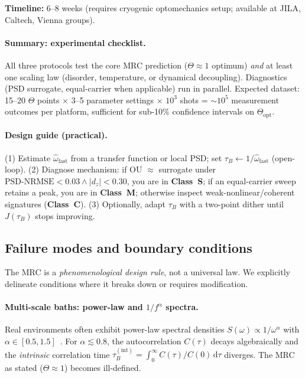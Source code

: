 \documentclass[11pt,letterpaper]{article}
\DeclareRobustCommand{\classS}{\textbf{Class~S}\xspace}
\DeclareRobustCommand{\classC}{\textbf{Class~C}\xspace}
\DeclareRobustCommand{\classM}{\textbf{Class~M}\xspace}
\DeclareRobustCommand{\GatePSD}{\ensuremath{\text{PSD-NRMSE}<0.03}\xspace}
\DeclareRobustCommand{\GateDZ}{\ensuremath{\lvert d_z\rvert<0.30}\xspace}
\DeclareRobustCommand{\GateEQ}{\ensuremath{\GatePSD \wedge \GateDZ}\xspace}
\begin{document}
\textbf{Timeline:} 6--8 weeks (requires cryogenic optomechanics setup;
available at JILA, Caltech, Vienna groups).

\paragraph{Summary: experimental checklist.}
All three protocols test the core MRC prediction ($\Theta\approx 1$ optimum)
\emph{and} at least one scaling law (disorder, temperature, or dynamical
decoupling). Diagnostics (PSD surrogate, equal-carrier when applicable) run
in parallel. Expected dataset: 15--20 $\Theta$ points $\times$ 3--5 parameter
settings $\times$ $10^3$ shots = $\sim 10^5$ measurement outcomes per platform,
sufficient for sub-10\% confidence intervals on $\Theta_{\text{opt}}$.

\paragraph*{Design guide (practical).}
(1) Estimate $\hat{\omega}_{\mathrm{fast}}$ from a transfer function or local PSD; set $\tau_B\leftarrow 1/\hat{\omega}_{\mathrm{fast}}$ (open-loop).
(2) Diagnose mechanism: if OU $\approx$ surrogate under \GateEQ, you are in \classS; if an equal-carrier sweep retains a peak, you are in \classM; otherwise inspect weak-nonlinear/coherent signatures (\classC).
(3) Optionally, adapt $\tau_B$ with a two-point dither until $J(\tau_B)$ stops improving.

\subsection{Failure modes and boundary conditions}
\label{sec:failure_modes}

The MRC is a \emph{phenomenological design rule}, not a universal law. We explicitly delineate conditions where it breaks down or requires modification.

\paragraph{Multi-scale baths: power-law and $1/f^\alpha$ spectra.}
Real environments often exhibit power-law spectral densities $S(\omega)\propto 1/\omega^\alpha$ with $\alpha\in[0.5, 1.5]$~\cite{Schlosshauer2019}. For $\alpha\lesssim 0.8$, the autocorrelation $C(\tau)$ decays algebraically and the \emph{intrinsic} correlation time $\tau_B^{(\text{int})}=\int_0^\infty C(\tau)/C(0)\,\mathrm{d}\tau$ diverges. The MRC as stated ($\Theta\approx 1$) becomes ill-defined.
\end{document}
